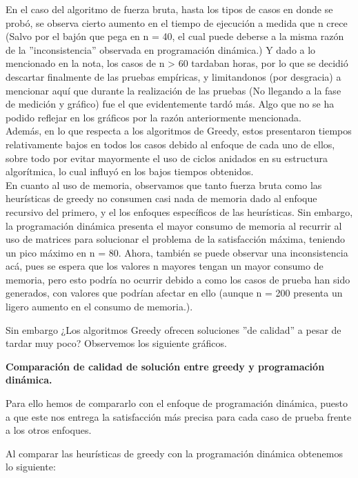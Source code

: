 En el caso del algoritmo de fuerza bruta, hasta los tipos de casos en donde se probó, se observa cierto aumento en el tiempo de ejecución a medida que n crece (Salvo por el bajón que pega en n = 40, el cual puede deberse a la misma razón de la ''inconsistencia'' observada en programación dinámica.)
Y dado a lo mencionado en la nota, los casos de n > 60 tardaban horas, por lo que se decidió descartar finalmente de las pruebas empíricas, y limitandonos (por desgracia) a mencionar aquí que durante la realización de las pruebas (No llegando a la fase de medición y gráfico) fue el que evidentemente tardó más.
Algo que no se ha podido reflejar en los gráficos por la razón anteriormente mencionada.
\\

Además, en lo que respecta a los algoritmos de Greedy, estos presentaron tiempos relativamente bajos en todos los casos debido al enfoque de cada uno de ellos, sobre todo por evitar mayormente el uso de ciclos anidados en su estructura algorítmica, lo cual influyó en los bajos tiempos obtenidos.
\\

En cuanto al uso de memoria, observamos que tanto fuerza bruta como las heurísticas de greedy no consumen casi nada de memoria dado al enfoque recursivo del primero, y el los enfoques específicos de las heurísticas.
Sin embargo, la programación dinámica presenta el mayor consumo de memoria al recurrir al uso de matrices para solucionar el problema de la satisfacción máxima, teniendo un pico máximo en n = 80. Ahora, también se puede observar una inconsistencia acá, pues se espera que los valores n mayores
tengan un mayor consumo de memoria, pero esto podría no ocurrir debido a como los casos de prueba han sido generados, con valores que podrían afectar en ello (aunque n = 200 presenta un ligero aumento en el consumo de memoria.).


Sin embargo ¿Los algoritmos Greedy ofrecen soluciones ''de calidad'' a pesar de tardar muy poco? Observemos los siguiente gráficos.


\textbf{Comparación de calidad de solución entre greedy y programación dinámica.}


Para ello hemos de compararlo con el enfoque de programación dinámica, puesto a que este nos entrega la satisfacción más precisa para cada caso de prueba frente a los otros enfoques.


Al comparar las heurísticas de greedy con la programación dinámica obtenemos lo siguiente:

